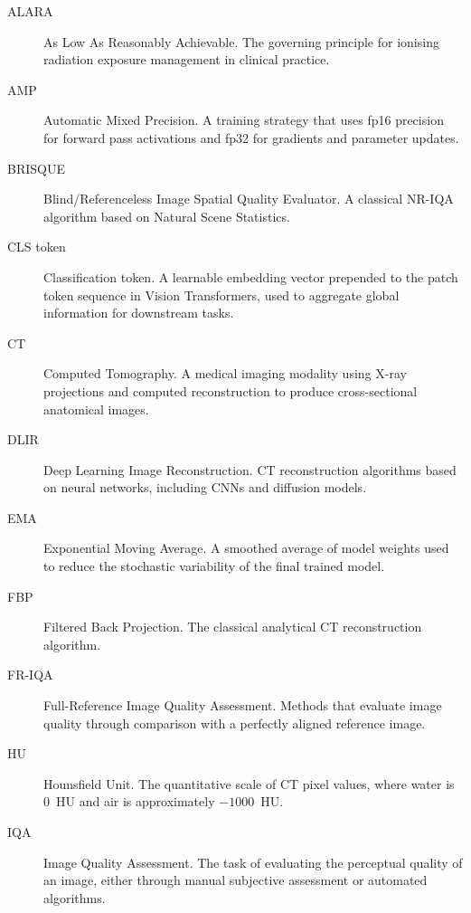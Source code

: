 \begin{description}
    \item[ALARA] As Low As Reasonably Achievable. The governing principle for ionising
    radiation exposure management in clinical practice.

    \item[AMP] Automatic Mixed Precision. A training strategy that uses fp16 precision
    for forward pass activations and fp32 for gradients and parameter updates.

    \item[BRISQUE] Blind/Referenceless Image Spatial Quality Evaluator. A classical
    NR-IQA algorithm based on Natural Scene Statistics.

    \item[CLS token] Classification token. A learnable embedding vector prepended to
    the patch token sequence in Vision Transformers, used to aggregate global information
    for downstream tasks.

    \item[CT] Computed Tomography. A medical imaging modality using X-ray projections
    and computed reconstruction to produce cross-sectional anatomical images.

    \item[DLIR] Deep Learning Image Reconstruction. CT reconstruction algorithms based
    on neural networks, including CNNs and diffusion models.

    \item[EMA] Exponential Moving Average. A smoothed average of model weights used
    to reduce the stochastic variability of the final trained model.

    \item[FBP] Filtered Back Projection. The classical analytical CT reconstruction
    algorithm.

    \item[FR-IQA] Full-Reference Image Quality Assessment. Methods that evaluate image
    quality through comparison with a perfectly aligned reference image.

    \item[HU] Hounsfield Unit. The quantitative scale of CT pixel values, where water
    is 0~HU and air is approximately $-1000$~HU.

    \item[IQA] Image Quality Assessment. The task of evaluating the perceptual quality
    of an image, either through manual subjective assessment or automated algorithms.


\end{description}
